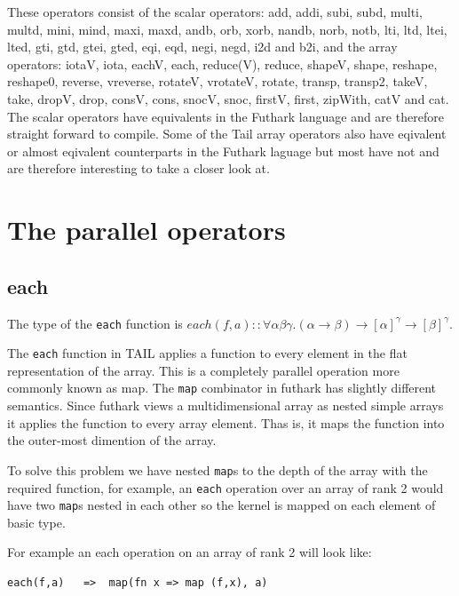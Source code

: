 \documentclass[11pt]{article}
\begin{document}
These operators consist of the scalar operators: add, addi, subi, subd, multi, multd, mini, mind, maxi, maxd, andb, orb, xorb, nandb, norb, notb, lti, ltd, ltei, lted, gti, gtd, gtei, gted, eqi, eqd, negi, negd, i2d and b2i, and the array operators: iotaV, iota, eachV, each, reduce(V), reduce, shapeV, shape, reshape, reshape0, reverse, vreverse, rotateV, vrotateV, rotate, transp, transp2, takeV, take, dropV, drop, consV, cons, snocV, snoc, firstV, first, zipWith, catV and cat. \\

The scalar operators have equivalents in the Futhark language and are therefore straight forward to compile. Some of the Tail array operators also have eqivalent or almost eqivalent counterparts in the Futhark laguage but most have not and are therefore interesting to take a closer look at.

\section{The parallel operators}

\subsection{each}

The type of the {\tt each} function is $each(f,a) :: \forall\alpha\beta\gamma.(\alpha \to \beta) \to [\alpha]^\gamma \to [\beta]^\gamma$.

The {\tt each} function in TAIL applies a function to every element in the flat representation of the array. This is a completely parallel operation more commonly known as map. The {\tt map} combinator in futhark has slightly different semantics.
Since futhark views a multidimensional array as nested simple arrays it applies the function to every array element.
Thas is, it maps the function into the outer-most dimention of the array.

To solve this problem we have nested {\tt map}s to the depth of the array with the required function, for example, an {\tt each} operation over an array of rank 2 would have two {\tt map}s nested in each other so the kernel is mapped on each element of basic type.

For example an each operation on an array of rank 2 will look like:
\begin{lstlisting}[numbers=none,frame=none]
each(f,a)	=>	map(fn x => map (f,x), a)
\end{lstlisting}
\end{document}
